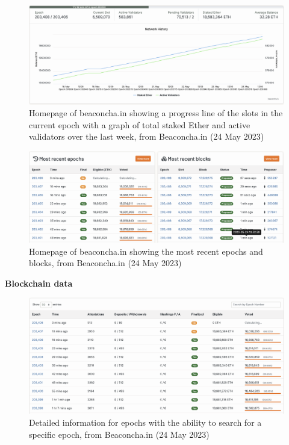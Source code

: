 \documentclass[UTF8]{article}
\begin{document}
{\begin{figure}[htbp]
\begin{center}
\includegraphics[width=0.9\linewidth]{images/bhomepg}
\caption{Homepage of beaconcha.in showing a progress line of the slots in the current epoch with a graph of total staked Ether and active validators over the last week, from Beaconcha.in (24 May 2023)}
\label{fig:bhomepg}
\end{center}
\end{figure}

\begin{figure}[htbp]
\begin{center}
\includegraphics[width=0.9\linewidth]{images/bhomepg2}
\caption{Homepage of beaconcha.in showing the most recent epochs and blocks, from Beaconcha.in (24 May 2023)}
\label{fig:bhomepg2}
\end{center}
\end{figure}
\clearpage


\textbf{Blockchain data}
\begin{figure}[htbp]
\begin{center}
\includegraphics[width=0.9\linewidth]{images/bepochs}
\caption{Detailed information for epochs with the ability to search for a specific epoch, from Beaconcha.in (24 May 2023)}
\label{fig:bepochs}
\end{center}
\end{figure}

}
\end{document}
